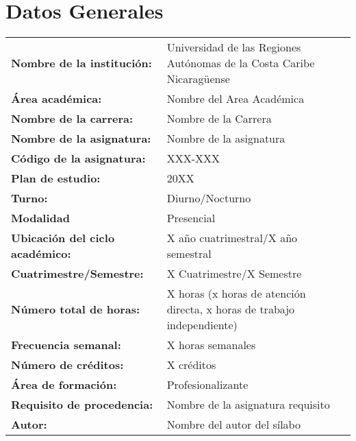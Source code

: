\section{Datos Generales}

\begin{center}
    \begin{doublespace}
        \begin{tabular}{ p{} p{} }
            \textbf{Nombre de la institución:}      & Universidad de las Regiones Autónomas de la Costa Caribe Nicaragüense   \\
            \textbf{Área académica:}                & Nombre del Area Académica                                               \\
            \textbf{Nombre de la carrera:}          & Nombre de la Carrera                                                    \\
            \textbf{Nombre de la asignatura:}       & Nombre de la asignatura                                                 \\
            \textbf{Código de la asignatura:}       & XXX-XXX                                                                 \\
            \textbf{Plan de estudio:}               & 20XX                                                                    \\
            \textbf{Turno:}                         & Diurno/Nocturno                                                         \\
            \textbf{Modalidad}                      & Presencial                                                              \\
            \textbf{Ubicación del ciclo académico:} & X año cuatrimestral/X año semestral                                     \\
            \textbf{Cuatrimestre/Semestre:}         & X Cuatrimestre/X Semestre                                               \\
            \textbf{Número total de horas:}         & X horas (x horas de atención directa, x horas de trabajo independiente) \\
            \textbf{Frecuencia semanal:}            & X horas semanales                                                       \\
            \textbf{Número de créditos:}            & X créditos                                                              \\
            \textbf{Área de formación:}             & Profesionalizante                                                       \\
            \textbf{Requisito de procedencia:}      & Nombre de la asignatura requisito                                       \\
            \textbf{Autor:}                         & Nombre del autor del sílabo                                             \\
        \end{tabular}
    \end{doublespace}
\end{center}
\pagebreak